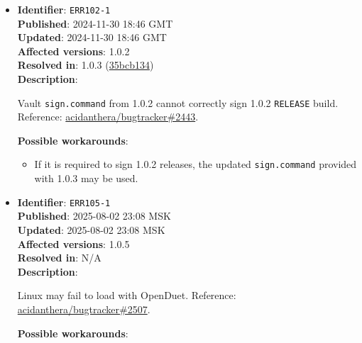 \documentclass[]{article}
\providecommand{\tightlist}{%
  \setlength{\itemsep}{0pt}\setlength{\parskip}{0pt}}
\begin{document}
\begin{itemize}
  \textbf{Possible workarounds}:
  \begin{itemize}
    \tightlist

    \item For 0.9.8 use version of \texttt{ocvalidate} provided in a
    \href{https://github.com/acidanthera/bugtracker/issues/2379#issuecomment-1933674398}{comment}
    on the above issue.

  \end{itemize}

  \item
  \textbf{Identifier}: \texttt{ERR102-1} \\
  \textbf{Published}: 2024-11-30 18:46 GMT \\
  \textbf{Updated}: 2024-11-30 18:46 GMT \\
  \textbf{Affected versions}: 1.0.2 \\
  \textbf{Resolved in}: 1.0.3 (\href{https://github.com/acidanthera/OpenCorePkg/commit/35bcb134f19df7c04275142e22c9fec68b72ff2d}{35bcb134}) \\
  \textbf{Description}:

  Vault \texttt{sign.command} from 1.0.2 cannot correctly sign 1.0.2 \texttt{RELEASE} build. Reference:
  \href{https://github.com/acidanthera/bugtracker/issues/2443}{acidanthera/bugtracker\#2443}.

  \textbf{Possible workarounds}:
  \begin{itemize}
    \tightlist

    \item If it is required to sign 1.0.2 releases, the updated
    \texttt{sign.command} provided with 1.0.3 may be used.
  \end{itemize}

\item
  \textbf{Identifier}: \texttt{ERR105-1} \\
  \textbf{Published}: 2025-08-02 23:08 MSK \\
  \textbf{Updated}: 2025-08-02 23:08 MSK \\
  \textbf{Affected versions}: 1.0.5 \\
  \textbf{Resolved in}: N/A \\
  \textbf{Description}:

  Linux may fail to load with OpenDuet. Reference:
  \href{https://github.com/acidanthera/bugtracker/issues/2507}{acidanthera/bugtracker\#2507}.

  \textbf{Possible workarounds}:
  \begin{itemize}
    \tightlist


\end{itemize}
\end{itemize}
\end{document}
